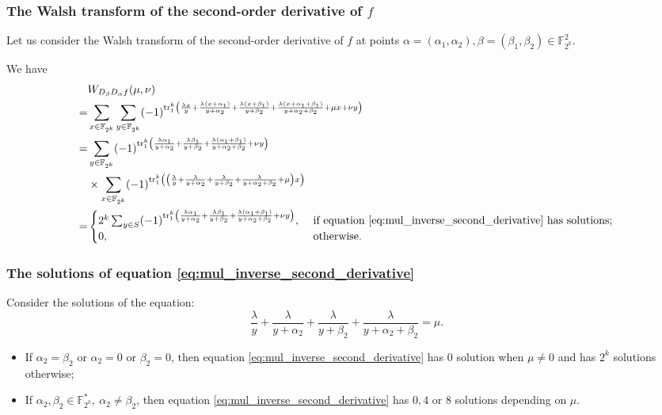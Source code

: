 \documentclass[
    aspectratio=169,                   %
]{beamer}
\newcommand{\F}{\mathbb{F}}
\newcommand{\Fks}{\mathbb{F}_{2^k}^*}
\newcommand{\Fk}{\mathbb{F}_{2^k}}
\newcommand{\tr}{\operatorname{tr}_1^k}
\begin{document}
    \begin{frame}
        \frametitle{The Walsh transform of the second-order derivative of $ f $}
    
        Let us consider the Walsh transform of the second-order derivative of $ f $ 
        at points $ \alpha=(\alpha_1,\alpha_2),\beta=(\beta_1,\beta_2)\in\Fk^2 $. 

        We have 
        \begin{align*}
            &W_{D_{\beta}D_{\alpha}f}(\mu,\nu)\\
            =&\sum_{x\in\F_{2^k}}\sum_{y\in\F_{2^k}}(-1)^{\tr\left(\frac{\lambda x}{y}+\frac{\lambda (x+\alpha_1)}{y+\alpha_2}+\frac{\lambda (x+\beta_1)}{y+\beta_2}+\frac{\lambda (x+\alpha_1+\beta_1)}{y+\alpha_2+\beta_2}+\mu x+\nu y\right)}\nonumber\\
        =&\sum_{y\in\F_{2^k}}(-1)^{\tr\left(\frac{\lambda\alpha_1}{y+\alpha_2}+\frac{\lambda\beta_1}{y+\beta_2}+\frac{\lambda(\alpha_1+\beta_1)}{y+\alpha_2+\beta_2}+\nu y\right)}\nonumber\\
        &\times \sum_{x\in\F_{2^k}}(-1)^{\tr\left(\left(\frac{\lambda}{y}+\frac{\lambda}{y+\alpha_2}+\frac{\lambda}{y+\beta_2}+\frac{\lambda}{y+\alpha_2+\beta_2}+\mu\right)x\right)}\nonumber\\
            =&\begin{cases}
                2^k\sum_{y\in S}(-1)^{\tr\left(\frac{\lambda\alpha_1}{y+\alpha_2}+\frac{\lambda\beta_1}{y+\beta_2}+\frac{\lambda(\alpha_1+\beta_1)}{y+\alpha_2+\beta_2}+\nu y\right)},&~\text{if~equation}~\eqref{eq:mul_inverse_second_derivative}~\text{has solutions};\\
            0, &~\text{otherwise}.
            \end{cases}
        \end{align*}
    \end{frame}


    \begin{frame}
        \frametitle{The solutions of  equation \eqref{eq:mul_inverse_second_derivative}}
        Consider the solutions of the equation: 
        \begin{equation}\label{eq:mul_inverse_second_derivative}
            \frac{\lambda}{y}+\frac{\lambda}{y+\alpha_2}+\frac{\lambda}{y+\beta_2}+\frac{\lambda}{y+\alpha_2+\beta_2}=\mu.
        \end{equation}
        \begin{itemize}
            \item If $ \alpha_2=\beta_2 $ or $ \alpha_2=0 $ or $ \beta_2=0 $, 
            then equation \eqref{eq:mul_inverse_second_derivative} has $ 0 $ solution when
            $ \mu\ne 0 $ and has $ 2^k $ solutions otherwise;
            \item If $ \alpha_2,\beta_2\in\Fks,~\alpha_2\ne\beta_2 $, 
            then equation \eqref{eq:mul_inverse_second_derivative} has $ 0,4 $ or $ 8 $ solutions depending on $ \mu $.
        \end{itemize}
    \end{frame}
\end{document}
